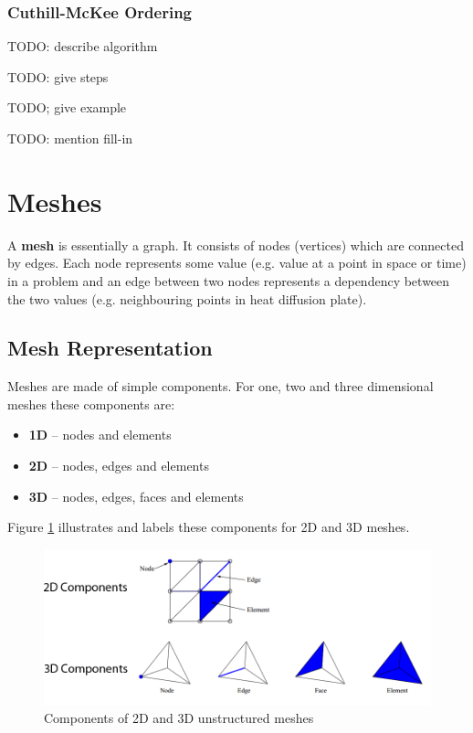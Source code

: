 \documentclass{article}
\begin{document}
\subsubsection{Cuthill-McKee Ordering}

TODO: describe algorithm

TODO: give steps

TODO; give example

TODO: mention fill-in

\section{Meshes}

A \textbf{mesh} is essentially a graph. It consists of nodes (vertices) which are connected by edges. Each node represents some value (e.g. value at a point in space or time) in a problem and an edge between two nodes represents a dependency between the two values (e.g. neighbouring points in heat diffusion plate).

\subsection{Mesh Representation}
\label{sec:mesh-representation}

Meshes are made of simple components. For one, two and three dimensional meshes these components are:
\begin{itemize}
	\item \textbf{1D} -- nodes and elements
	\item \textbf{2D} -- nodes, edges and elements
	\item \textbf{3D} -- nodes, edges, faces and elements
\end{itemize}
Figure \ref{fig:mesh-components} illustrates and labels these components for 2D and 3D meshes.

\begin{figure}
	\centering
	\includegraphics[scale=0.4]{figures/unstructured-mesh-components.png}
	\caption{Components of 2D and 3D unstructured meshes}
	\label{fig:mesh-components}
\end{figure}
\end{document}
